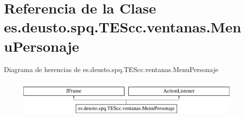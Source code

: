 \hypertarget{classes_1_1deusto_1_1spq_1_1_t_e_scc_1_1ventanas_1_1_menu_personaje}{\section{Referencia de la Clase es.\+deusto.\+spq.\+T\+E\+Scc.\+ventanas.\+Menu\+Personaje}
\label{classes_1_1deusto_1_1spq_1_1_t_e_scc_1_1ventanas_1_1_menu_personaje}
}
Diagrama de herencias de es.\+deusto.\+spq.\+T\+E\+Scc.\+ventanas.\+Menu\+Personaje\begin{figure}[H]
\begin{center}
\leavevmode
\includegraphics[height=1.958042cm]{classes_1_1deusto_1_1spq_1_1_t_e_scc_1_1ventanas_1_1_menu_personaje}
\end{center}
\end{figure}
